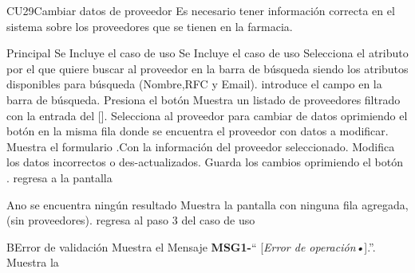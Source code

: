 \begin{UseCase}{CU29}{Cambiar datos de proveedor}{
	Es necesario tener información correcta en el sistema sobre los proveedores que se tienen en la farmacia.
	}
	\end{UseCase}
	\begin{UCtrayectoria}{Principal}
		\UCpaso Se Incluye el caso de uso 
		\UCpaso Se Incluye el caso de uso 
		\UCpaso [\UCactor]Selecciona el atributo por el que quiere buscar al proveedor en la barra de búsqueda siendo los atributos disponibles para búsqueda (Nombre,RFC y Email).
		\UCpaso [\UCactor] introduce el campo en la barra de búsqueda.
		\UCpaso [\UCactor] Presiona el botón  
		\UCpaso Muestra un listado de proveedores filtrado con la entrada del [\UCactor].
		\UCpaso[\UCactor] Selecciona al proveedor para cambiar de datos oprimiendo el botón  en la misma fila donde se encuentra el proveedor con datos a modificar.
		\UCpaso Muestra el formulario .Con la información del proveedor seleccionado.
		\UCpaso [\UCactor] Modifica los datos incorrectos o des-actualizados.
		\UCpaso [\UCactor] Guarda los cambios oprimiendo el botón .
		\UCpaso regresa a la pantalla 
	\end{UCtrayectoria}

\begin{UCtrayectoriaA}{A}{no se encuentra ningún resultado}
	\UCpaso Muestra la pantalla 
	con ninguna fila agregada, (sin proveedores).
	\UCpaso regresa al paso 3 del caso de uso 
\end{UCtrayectoriaA}
\begin{UCtrayectoriaA}{B}{Error de validación}
	\UCpaso Muestra el Mensaje {\bf MSG1-}`` [{\em Error de operación\textsl{•}}].''.
			\UCpaso Muestra la 
\end{UCtrayectoriaA}